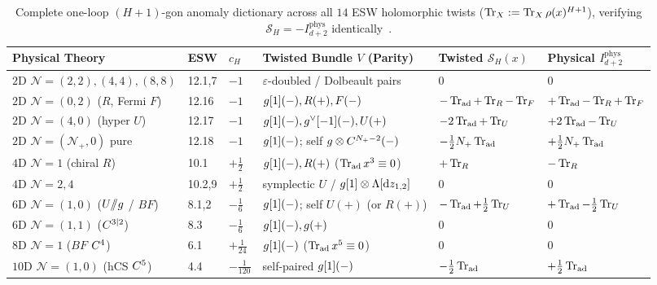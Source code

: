 \begin{table}[H]
\centering
\scriptsize
\setlength{\tabcolsep}{3.3pt}
\renewcommand{\arraystretch}{1.14}
\begin{tabularx}{\textwidth}{@{}lll>{\raggedright\arraybackslash}Xll@{}}
\toprule
\textbf{Physical Theory} & \textbf{ESW} & \textbf{$c_H$} & \textbf{Twisted Bundle $V$ (Parity)} & \textbf{Twisted $\mathcal{S}_H(x)$} & \textbf{Physical $I^{\mathrm{phys}}_{d+2}$} \\
\midrule
$2\mathrm{D}$ $\mathcal{N}=(2,2),(4,4),(8,8)$ & 12.1,7 & $-1$ & $\varepsilon$-doubled / Dolbeault pairs & $0$ & $0$ \\
$2\mathrm{D}$ $\mathcal{N}=(0,2)$ ($R$, Fermi $F$) & 12.16 & $-1$ & $g[1](-), R(+), F(-)$ & $-\operatorname{Tr}_{\mathrm{ad}}+\operatorname{Tr}_R-\operatorname{Tr}_F$ & $+\operatorname{Tr}_{\mathrm{ad}}-\operatorname{Tr}_R+\operatorname{Tr}_F$ \\
$2\mathrm{D}$ $\mathcal{N}=(4,0)$ (hyper $U$) & 12.17 & $-1$ & $g[1](-), g^\vee[-1](-), U(+)$ & $-2\operatorname{Tr}_{\mathrm{ad}}+\operatorname{Tr}_U$ & $+2\operatorname{Tr}_{\mathrm{ad}}-\operatorname{Tr}_U$ \\
$2\mathrm{D}$ $\mathcal{N}=(\mathcal{N}_+,0)$ pure & 12.18 & $-1$ & $g[1](-)$; self $g\otimes C^{N_+-2}(-)$ & $-\frac{1}{2}N_+\operatorname{Tr}_{\mathrm{ad}}$ & $+\frac{1}{2}N_+\operatorname{Tr}_{\mathrm{ad}}$ \\
$4\mathrm{D}$ $\mathcal{N}=1$ (chiral $R$) & 10.1 & $+\frac{1}{2}$ & $g[1](-), R(+)$ ($\operatorname{Tr}_{\mathrm{ad}}x^3\equiv 0$) & $+\operatorname{Tr}_R$ & $-\operatorname{Tr}_R$ \\
$4\mathrm{D}$ $\mathcal{N}=2, 4$ & 10.2,9 & $+\frac{1}{2}$ & symplectic $U$ / $g[1]\otimes\Lambda[\mathrm{d} z_{1,2}]$ & $0$ & $0$ \\
$6\mathrm{D}$ $\mathcal{N}=(1,0)$ ($U/\mkern-6mu/g$ / $BF$) & 8.1,2 & $-\frac{1}{6}$ & $g[1](-)$; self $U(+)$ (or $R(+)$) & $-\operatorname{Tr}_{\mathrm{ad}}+\frac{1}{2}\operatorname{Tr}_U$ & $+\operatorname{Tr}_{\mathrm{ad}}-\frac{1}{2}\operatorname{Tr}_U$ \\
$6\mathrm{D}$ $\mathcal{N}=(1,1)$ ($C^{3|2}$) & 8.3 & $-\frac{1}{6}$ & $g[1](-), g(+)$ & $0$ & $0$ \\
$8\mathrm{D}$ $\mathcal{N}=1$ ($BF$ $C^4$) & 6.1 & $+\frac{1}{24}$ & $g[1](-)$ ($\operatorname{Tr}_{\mathrm{ad}}x^5\equiv 0$) & $0$ & $0$ \\
$10\mathrm{D}$ $\mathcal{N}=(1,0)$ (hCS $C^5$) & 4.4 & $-\frac{1}{120}$ & self-paired $g[1](-)$ & $-\frac{1}{2}\operatorname{Tr}_{\mathrm{ad}}$ & $+\frac{1}{2}\operatorname{Tr}_{\mathrm{ad}}$ \\
\bottomrule
\end{tabularx}
\caption{Complete one-loop $(H+1)$-gon anomaly dictionary across all $14$ ESW holomorphic twists ($\operatorname{Tr}_X := \operatorname{Tr}_X\rho(x)^{H+1}$), verifying $\mathcal{S}_H = -I^{\mathrm{phys}}_{d+2}$ identically~\cite{ESW,GW18,Repo9e833c8}.}
\label{tab:esw-14-oneloop}
\end{table}

